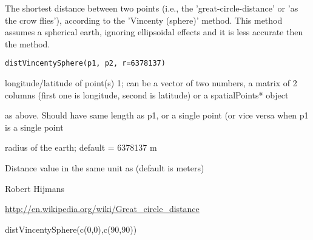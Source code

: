 \begin{Description}\relax
The shortest distance between two points (i.e., the 'great-circle-distance' or 'as the crow flies'), according to the 'Vincenty (sphere)' method. 
This method assumes a spherical earth, ignoring ellipsoidal effects and it is less accurate then the  method.
\end{Description}
\begin{Usage}
\begin{verbatim}
distVincentySphere(p1, p2, r=6378137)
\end{verbatim}
\end{Usage}
\begin{Arguments}
\begin{ldescription}
\item[\code{p1}] longitude/latitude of point(s) 1; can be a vector of two numbers, a matrix of 2 columns (first one is longitude, second is latitude) or a spatialPoints* object
\item[\code{p2}] as above. Should have same length as p1, or a single point (or vice versa when p1 is a single point
\item[\code{r}] radius of the earth; default = 6378137 m
\end{ldescription}
\end{Arguments}
\begin{Value}
Distance value in the same unit as  (default is meters)
\end{Value}
\begin{Author}\relax
Robert Hijmans
\end{Author}
\begin{References}\relax
\url{http://en.wikipedia.org/wiki/Great_circle_distance}
\end{References}
\begin{SeeAlso}\relax
{}
\end{SeeAlso}
\begin{Examples}
\begin{ExampleCode}
distVincentySphere(c(0,0),c(90,90))
\end{ExampleCode}
\end{Examples}

